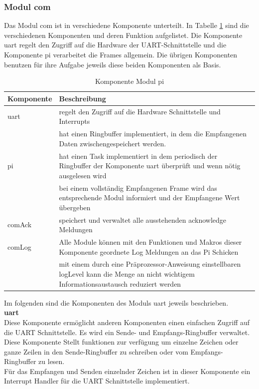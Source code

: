\documentclass[../../main.tex]{subfiles}
\begin{document}
    \subsubsection{Modul com} \label{et_software_tiny_com}
    Das Modul com ist in verschiedene Komponente unterteilt. In Tabelle \ref{tab:et_mc_com} sind die verschiedenen Komponenten und deren Funktion aufgelistet. Die Komponente uart regelt den Zugriff auf die Hardware der UART-Schnittstelle und die Komponente pi verarbeitet die Frames allgemein. Die übrigen Komponenten benutzen für ihre Aufgabe jeweils diese beiden Komponenten als Basis.

    \begin{table}[H]
        \centering
        \begin{tabular}{|l|p{12cm}|}
        \hline
        \textbf{Komponente} & \textbf{Beschreibung}    \\ \hline
        uart  & regelt den Zugriff auf die Hardware Schnittstelle und Interrupts \\ & hat einen Ringbuffer implementiert, in dem die Empfangenen Daten zwischengespeichert werden.\\ \hline
        pi    & hat einen Task implementiert in dem periodisch der Ringbuffer der Komponente uart überprüft und wenn nötig ausgelesen wird \\ & bei einem vollständig Empfangenen Frame wird das entsprechende Modul informiert und der Empfangene Wert übergeben \\ \hline
        comAck & speichert und verwaltet alle ausstehenden acknowledge Meldungen \\ \hline
        comLog & Alle Module können mit den Funktionen und Makros dieser Komponente geordnete Log Meldungen an das Pi Schicken \\ & mit einem durch eine Präprozessor-Anweisung einstellbaren logLevel kann die Menge an nicht wichtigem Informationsaustausch reduziert werden \\ \hline
        \end{tabular}
        \caption{Komponente Modul pi}
        \label{tab:et_mc_com}
    \end{table}

    Im folgenden sind die Komponenten des Moduls uart jeweils beschrieben.\\

    \textbf{uart}\\
    Diese Komponente ermöglicht anderen Komponenten einen einfachen Zugriff auf die UART Schnittstelle. Es wird ein Sende- und Empfangs-Ringbuffer verwaltet. Diese Komponente Stellt funktionen zur verfügung um einzelne Zeichen oder ganze Zeilen in den Sende-Ringbuffer zu schreiben oder vom Empfangs-Ringbuffer zu lesen.\\
    Für das Empfangen und Senden einzelnder Zeichen ist in dieser Komponente ein Interrupt Handler für die UART Schnittstelle implementiert.\\
\end{document}
